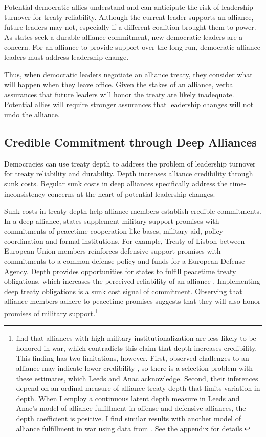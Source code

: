 \documentclass[12pt]{article}
\begin{document}
Potential democratic allies understand and can anticipate the risk of leadership turnover for treaty reliability. 
Although the current leader supports an alliance, future leaders may not, especially if a different coalition brought them to power. 
As states seek a durable alliance commitment, new democratic leaders are a concern. 
For an alliance to provide support over the long run, democratic alliance leaders must address leadership change.


Thus, when democratic leaders negotiate an alliance treaty, they consider what will happen when they leave office.
Given the stakes of an alliance, verbal assurances that future leaders will honor the treaty are likely inadequate.
Potential allies will require stronger assurances that leadership changes will not undo the alliance. 



\subsection{Credible Commitment through Deep Alliances}

Democracies can use treaty depth to address the problem of leadership turnover for treaty reliability and durability. 
Depth increases alliance credibility through sunk costs.
Regular sunk costs in deep alliances specifically address the time-inconsistency concerns at the heart of potential leadership changes.


Sunk costs in treaty depth help alliance members establish credible commitments.
In a deep alliance, states supplement military support promises with commitments of peacetime cooperation like bases, military aid, policy coordination and formal institutions. 
For example, Treaty of Lisbon between European Union members reinforces defensive support promises with commitments to a common defense policy and funds for a European Defense Agency. 
Depth provides opportunities for states to fulfill peacetime treaty obligations, which increases the perceived reliability of an alliance \citep{Morrow1994}. 
Implementing deep treaty obligations is a sunk cost signal of commitment.
Observing that alliance members adhere to peacetime promises suggests that they will also honor promises of military support.\footnote{\citet{LeedsAnac2005} find that alliances with high military institutionalization are less likely to be honored in war, which contradicts this claim that depth increases credibility. 
This finding has two limitations, however. 
First, observed challenges to an alliance may indicate lower credibility \citep{Smith1995}, so there is a selection problem with these estimates, which Leeds and Anac acknowledge. 
Second, their inferences depend on an ordinal measure of alliance treaty depth that limits variation in depth. 
When I employ a continuous latent depth measure in Leeds and Anac's model of alliance fulfillment in offense and defensive alliances, the depth coefficient is positive. 
I find similar results with another model of alliance fulfillment in war using data from \citet{BerkemeierFuhrmann2018}.
See the appendix for details.} 
\end{document}
